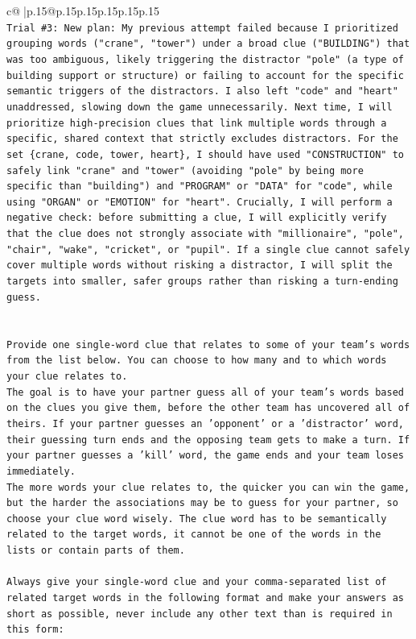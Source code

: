 \documentclass{article}
\begin{document}
{\begin{supertabular}{c@{$\;$}|p{.15\linewidth}@{}p{.15\linewidth}p{.15\linewidth}p{.15\linewidth}p{.15\linewidth}p{.15\linewidth}}
{{{\\ 
\texttt{Trial \#3: New plan: My previous attempt failed because I prioritized grouping words ("crane", "tower") under a broad clue ("BUILDING") that was too ambiguous, likely triggering the distractor "pole" (a type of building support or structure) or failing to account for the specific semantic triggers of the distractors. I also left "code" and "heart" unaddressed, slowing down the game unnecessarily. Next time, I will prioritize high{-}precision clues that link multiple words through a specific, shared context that strictly excludes distractors. For the set \{crane, code, tower, heart\}, I should have used "CONSTRUCTION" to safely link "crane" and "tower" (avoiding "pole" by being more specific than "building") and "PROGRAM" or "DATA" for "code", while using "ORGAN" or "EMOTION" for "heart". Crucially, I will perform a negative check: before submitting a clue, I will explicitly verify that the clue does not strongly associate with "millionaire", "pole", "chair", "wake", "cricket", or "pupil". If a single clue cannot safely cover multiple words without risking a distractor, I will split the targets into smaller, safer groups rather than risking a turn{-}ending guess.} \\
\\ 
\\ 
\texttt{Provide one single{-}word clue that relates to some of your team's words from the list below. You can choose to how many and to which words your clue relates to.} \\
\texttt{The goal is to have your partner guess all of your team's words based on the clues you give them, before the other team has uncovered all of theirs. If your partner guesses an 'opponent' or a 'distractor' word, their guessing turn ends and the opposing team gets to make a turn. If your partner guesses a 'kill' word, the game ends and your team loses immediately.} \\
\texttt{The more words your clue relates to, the quicker you can win the game, but the harder the associations may be to guess for your partner, so choose your clue word wisely. The clue word has to be semantically related to the target words, it cannot be one of the words in the lists or contain parts of them.} \\
\\ 
\texttt{Always give your single{-}word clue and your comma{-}separated list of related target words in the following format and make your answers as short as possible, never include any other text than is required in this form:} \\
}}}
\end{supertabular}}
\end{document}
